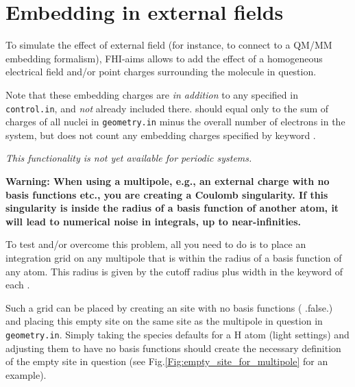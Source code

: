 \section{Embedding in external fields}

To simulate the effect of external field (for instance, to connect to
a QM/MM embedding formalism), FHI-aims allows to add the effect of
a homogeneous electrical field and/or point charges surrounding the
molecule in question.

Note that these embedding charges are \emph{in addition} to any
 specified in \texttt{control.in}, and \emph{not} already
included there.  should equal only to the sum of charges of all
nuclei in \texttt{geometry.in} minus the overall number of electrons in the
system, but does not count any embedding charges specified by keyword
. 

\emph{This functionality is not yet available for periodic systems.}

\textbf{Warning: When using a multipole, e.g., an external charge with
  no basis functions etc., you are creating a Coulomb singularity. 
  If this singularity is inside the radius of a basis function of
  another atom, it will lead to numerical noise in integrals, up to
  near-infinities.} 

To test and/or overcome this problem, all you need to do is to place
an integration grid on any multipole that is within the radius of a
basis function of any atom. This radius is given by the cutoff radius
plus width in the  keyword of each
. 

Such a grid can be placed by creating an  site with no basis
functions ( .false.) and placing this empty
site on the same site as the multipole in question in
\texttt{geometry.in}. Simply taking the species defaults for a H atom
(light settings) and adjusting them to have no basis functions should
create the necessary definition of the empty site in question (see Fig.\ref{Fig:empty_site_for_multipole} for an example).

